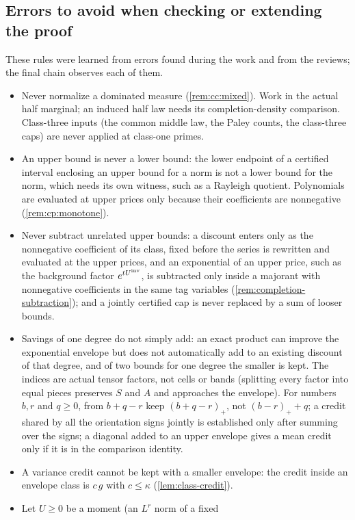 \subsection{Errors to avoid when checking or extending the proof}\label{subsec:obs:pitfalls}

These rules were learned from errors found during the work and from the
reviews; the final chain observes each of them.
\begin{itemize}
\item Never normalize a dominated measure (\cref{rem:cc:mixed}). Work in the
 actual half marginal; an induced half law needs its completion-density
 comparison. Class-three inputs (the common middle law, the Paley counts, the
 class-three caps) are never applied at class-one primes.
\item An upper bound is never a lower bound: the lower endpoint of a certified
 interval enclosing an upper bound for a norm is not a lower bound for the norm,
 which needs its own witness, such as a Rayleigh quotient. Polynomials are
 evaluated at upper prices only because their coefficients are nonnegative
 (\cref{rem:cp:monotone}).
\item Never subtract unrelated upper bounds: a discount enters only as the
 nonnegative coefficient of its class, fixed before the series is rewritten and
 evaluated at the upper prices, and an exponential of an upper price, such as
 the background factor $e^{tU^{\mathrm{inv}}}$, is subtracted only inside a majorant with
 nonnegative coefficients in the same tag variables
 (\cref{rem:completion-subtraction}); and a jointly certified cap is never
 replaced by a sum of looser bounds.
\item Savings of one degree do not simply add: an exact product can improve the
 exponential envelope but does not automatically add to an existing discount of
 that degree, and of two bounds for one degree the smaller is kept. The indices
 are actual tensor factors, not cells or bands (splitting every factor into
 equal pieces preserves $S$ and $A$ and approaches the envelope). For numbers $b,r$ and $q\ge0$, from $b+q-r$ keep $(b+q-r)_+$, not $(b-r)_++q$; a credit shared by all the orientation signs jointly is established only after summing over the signs; a diagonal added to an upper envelope gives
 a mean credit only if it is in the comparison identity.
\item A variance credit cannot be kept with a smaller envelope: the credit inside
 an envelope class is $c\,g$ with $c\le\kappa$ (\cref{lem:class-credit}).
\item Let $U\ge0$ be a moment (an $L^r$ norm of a fixed

\end{itemize}
